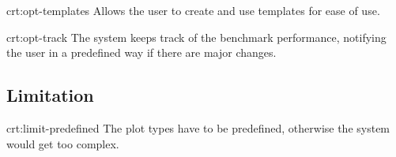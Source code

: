 {crt:opt-templates}
{Allows the \gls{user} to create and use \glspl{template} for ease of use.}

{crt:opt-track}
{The system keeps track of the benchmark performance, notifying the \gls{user} in a predefined way if there are major changes.}


\subsection{Limitation}

{crt:limit-predefined}
{The \gls{plot} types have to be predefined, otherwise the system would get too complex.}
